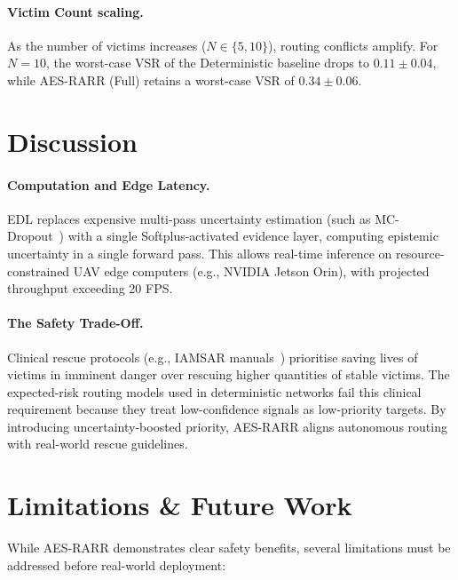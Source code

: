 \documentclass[11pt,a4paper]{article}
\begin{document}
\paragraph{Victim Count scaling.}
As the number of victims increases ($N \in \{5, 10\}$), routing conflicts amplify. For $N=10$, the worst-case VSR of the Deterministic baseline drops to $0.11 \pm 0.04$, while AES-RARR (Full) retains a worst-case VSR of $0.34 \pm 0.06$.

\section{Discussion}

\paragraph{Computation and Edge Latency.}
EDL replaces expensive multi-pass uncertainty estimation (such as MC-Dropout~\cite{gal2016}) with a single Softplus-activated evidence layer, computing epistemic uncertainty in a single forward pass.
This allows real-time inference on resource-constrained UAV edge computers (e.g., NVIDIA Jetson Orin), with projected throughput exceeding 20 FPS.

\paragraph{The Safety Trade-Off.}
Clinical rescue protocols (e.g., IAMSAR manuals~\cite{iamsar2019}) prioritise saving lives of victims in imminent danger over rescuing higher quantities of stable victims. The expected-risk routing models used in deterministic networks fail this clinical requirement because they treat low-confidence signals as low-priority targets. By introducing uncertainty-boosted priority, AES-RARR aligns autonomous routing with real-world rescue guidelines.

\section{Limitations & Future Work}

While AES-RARR demonstrates clear safety benefits, several limitations must be addressed before real-world deployment:
\end{document}
